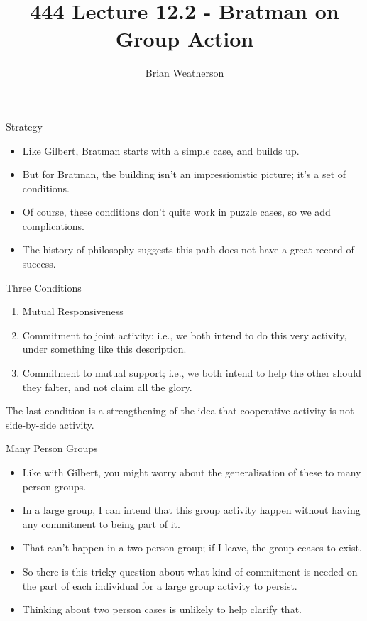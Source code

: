 \documentclass[
  ignorenonframetext,
]{beamer}
\title{444 Lecture 12.2 - Bratman on Group Action}
\author{Brian Weatherson}
\date{}
\providecommand{\tightlist}{%
  \setlength{\itemsep}{0pt}\setlength{\parskip}{0pt}}
\begin{document}
\frame{\titlepage}

\begin{frame}{Strategy}
\protect\hypertarget{strategy}{}
\begin{itemize}
\tightlist
\item
  Like Gilbert, Bratman starts with a simple case, and builds up.
\item
  But for Bratman, the building isn't an impressionistic picture; it's a
  set of conditions.
\item
  Of course, these conditions don't quite work in puzzle cases, so we
  add complications.
\item
  The history of philosophy suggests this path does not have a great
  record of success.
\end{itemize}
\end{frame}

\begin{frame}{Three Conditions}
\protect\hypertarget{three-conditions}{}
\begin{enumerate}
\tightlist
\item
  Mutual Responsiveness
\item
  Commitment to joint activity; i.e., we both intend to do this very
  activity, under something like this description.
\item
  Commitment to mutual support; i.e., we both intend to help the other
  should they falter, and not claim all the glory.
\end{enumerate}

The last condition is a strengthening of the idea that cooperative
activity is not side-by-side activity.
\end{frame}

\begin{frame}{Many Person Groups}
\protect\hypertarget{many-person-groups}{}
\begin{itemize}
\tightlist
\item
  Like with Gilbert, you might worry about the generalisation of these
  to many person groups.
\item
  In a large group, I can intend that this group activity happen without
  having any commitment to being part of it.
\item
  That can't happen in a two person group; if I leave, the group ceases
  to exist.
\item
  So there is this tricky question about what kind of commitment is
  needed on the part of each individual for a large group activity to
  persist.
\item
  Thinking about two person cases is unlikely to help clarify that.
\end{itemize}
\end{frame}
\end{document}
